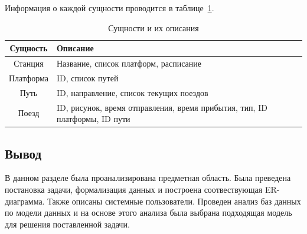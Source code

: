 Информация о каждой сущности проводится в таблице~\ref{tb:data}.

\begin{table}[ht]
	\begin{center}
		\begin{threeparttable}
			\caption{\label{tb:data} Сущности и их описания}
			\begin{tabular}{|c|p{10cm}|}
				\hline
				\textbf{Сущность} & \textbf{Описание} \\ \hline
				Станция & Название, список платформ, расписание \\ \hline
				Платформа & ID, список путей \\ \hline
				Путь & ID, направление, список текущих поездов \\ \hline
				Поезд & ID, рисунок, время отправления, время прибытия, тип, ID платформы, ID пути \\ \hline
			\end{tabular}
		\end{threeparttable}
	\end{center}
\end{table}

\subsection*{Вывод}
В данном разделе была проанализирована предметная область.
Была преведена постановка задачи, формализация данных и построена соотвествующая ER-диаграмма. 
Также описаны системные пользователи.
Проведен анализ баз данных по модели данных и на основе этого анализа была выбрана подходящая модель для решения поставленной задачи.